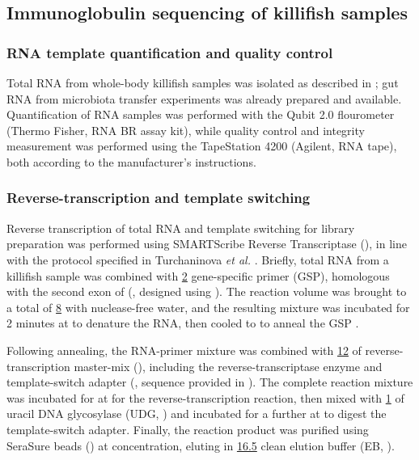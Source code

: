 \subsection{Immunoglobulin sequencing of killifish samples}
\label{sec:methods_molec_igseq}

\subsubsection{RNA template quantification and quality control}
\label{sec:methods_molec_igseq_template}

Total RNA from whole-body killifish samples was isolated as described in ; gut RNA from microbiota transfer experiments \parencite{smith2017microbiota} was already prepared and available. Quantification of RNA samples was performed with the Qubit 2.0 flourometer (Thermo Fisher, RNA BR assay kit), while quality control and integrity measurement was performed using the TapeStation 4200 (Agilent, RNA tape), both according to the manufacturer's instructions.

\subsubsection{Reverse-transcription and template switching}
\label{sec:methods_molec_igseq_rt}

Reverse transcription of total RNA and template switching for \igseq library preparation was performed using SMARTScribe Reverse Transcriptase (), in line with the protocol specified in Turchaninova \textit{et al.} \parencite{turchaninova2016igprep}. Briefly,  total RNA from a killifish sample was combined with \ul{2}  gene-specific primer (GSP), homologous with the second \ch exon of \Nfu {} (, designed using  \parencite{untergasser2012primer3}). The reaction volume was brought to a total of \ul{8} with nuclease-free water, and the resulting mixture was incubated for 2 minutes at  to denature the RNA, then cooled to  to anneal the GSP \parencite{turchaninova2016igprep}.

Following annealing, the RNA-primer mixture was combined with \ul{12} of reverse-transcription master-mix (), including the reverse-transcriptase enzyme and template-switch adapter (, sequence provided in \parencite{turchaninova2016igprep}). The complete reaction mixture was incubated for  at  for the reverse-transcription reaction, then mixed with \ul{1} of uracil DNA glycosylase (UDG, ) and incubated for a further  at  to digest the template-switch adapter. Finally, the reaction product was purified using SeraSure beads () at  concentration, eluting in \ul{16.5} clean elution buffer (EB, ).

